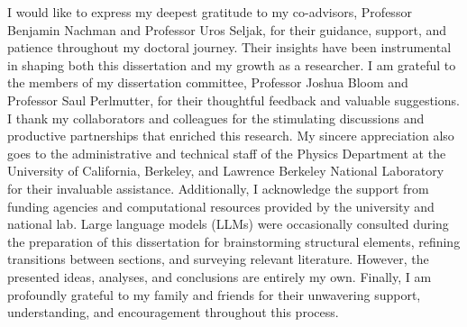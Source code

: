 \begin{acknowledgements}

    I would like to express my deepest gratitude to my co-advisors, Professor Benjamin Nachman and Professor Uros Seljak, for their guidance, support, and patience throughout my doctoral journey. Their insights have been instrumental in shaping both this dissertation and my growth as a researcher.
    I am grateful to the members of my dissertation committee, Professor Joshua Bloom and Professor Saul Perlmutter, for their thoughtful feedback and valuable suggestions.
    I thank my collaborators and colleagues for the stimulating discussions and productive partnerships that enriched this research.
    My sincere appreciation also goes to the administrative and technical staff of the Physics Department at the University of California, Berkeley, and Lawrence Berkeley National Laboratory for their invaluable assistance. Additionally, I acknowledge the support from funding agencies and computational resources provided by the university and national lab.
    Large language models (LLMs) were occasionally consulted during the preparation of this dissertation for brainstorming structural elements, refining transitions between sections, and surveying relevant literature. However, the presented ideas, analyses, and conclusions are entirely my own.
    Finally, I am profoundly grateful to my family and friends for their unwavering support, understanding, and encouragement throughout this process.
    
\end{acknowledgements}